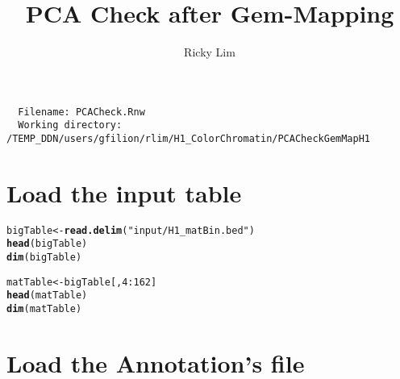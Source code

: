 \documentclass{article}\usepackage{graphicx, color}
\makeatletter
\newcommand{\hlfunctioncall}[1]{\textcolor[rgb]{0.501960784313725,0,0.329411764705882}{\textbf{#1}}}%
\newcommand{\hlstring}[1]{\textcolor[rgb]{0.6,0.6,1}{#1}}%
\newenvironment{kframe}{%
 \def\at@end@of@kframe{}%
 \ifinner\ifhmode%
  \def\at@end@of@kframe{\end{minipage}}%
  \begin{minipage}{\columnwidth}%
 \fi\fi%
 \def\FrameCommand##1{\hskip\@totalleftmargin \hskip-\fboxsep
 \colorbox{shadecolor}{##1}\hskip-\fboxsep
     \hskip-\linewidth \hskip-\@totalleftmargin \hskip\columnwidth}%
 \MakeFramed {\advance\hsize-\width
   \@totalleftmargin\z@ \linewidth\hsize
   \@setminipage}}%
 {\par\unskip\endMakeFramed%
 \at@end@of@kframe}
\newenvironment{knitrout}{}{} %
\makeatother
\begin{document}
\author{Ricky Lim}
\title{PCA Check after Gem-Mapping}
\maketitle

\begin{verbatim}
  Filename: PCACheck.Rnw 
  Working directory: /TEMP_DDN/users/gfilion/rlim/H1_ColorChromatin/PCACheckGemMapH1 
\end{verbatim}

\section{Load the input table}

\begin{knitrout}
\color{fgcolor}\begin{kframe}
\begin{alltt}
bigTable <- \hlfunctioncall{read.delim}(\hlstring{"input/H1_matBin.bed"})
\hlfunctioncall{head}(bigTable)
\hlfunctioncall{dim}(bigTable)

matTable <- bigTable[, 4:162]
\hlfunctioncall{head}(matTable)
\hlfunctioncall{dim}(matTable)
\end{alltt}
\end{kframe}
\end{knitrout}


\section{Load the Annotation's file}
\end{document}
